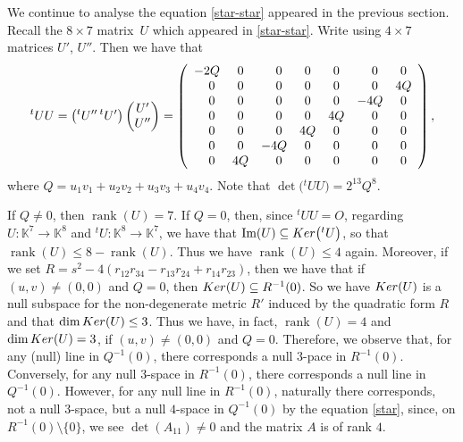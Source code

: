 \documentclass[11pt]{article}
\numberwithin{equation}{section}
\numberwithin{equation}{section}
\theoremstyle{definition}
\newcommand{\KK}{\mathbb{K}}
\newcommand{\0}{\boldsymbol{0}}
\newcommand{\rank}{\operatorname{rank}}
\begin{document}
We continue to analyse the equation \eqref{star-star} appeared in the previous section.
Recall the $8\times7$ matrix~$U$ which appeared in \eqref{star-star}.
Write  using $4\times 7$ matrices $U'$, $U''$.
Then we have that
\[
{}^tU U = \bigl({}^tU'' \, {}^t U'\bigr)\begin{pmatrix}U' \\ U''\end{pmatrix}
=
\left(
\begin{array}{ccccccc}
-2Q & 0 & \hphantom{-}0 & 0 & 0 & \hphantom{-}0 & 0
\\
\hphantom{-}0 & 0 & \hphantom{-}0 & 0 & 0 & \hphantom{-}0 & 4Q
\\
\hphantom{-}0 & 0 & \hphantom{-}0 & 0 & 0 & -4Q & 0
\\
\hphantom{-}0 & 0 & \hphantom{-}0 & 0 & 4Q & \hphantom{-}0 & 0
\\
\hphantom{-}0 & 0 & \hphantom{-}0 & 4Q & 0 & \hphantom{-}0 & 0
\\
\hphantom{-}0 & 0 & -4Q & 0 & 0 & \hphantom{-}0 & 0
\\
\hphantom{-}0 & 4Q & \hphantom{-}0 & 0 & 0 & \hphantom{-}0 & 0
\end{array}
\right),
\]
where $Q = u_1v_1 + u_2v_2 + u_3v_3 + u_4v_4$. Note that $\det\bigl({}^tU U\bigr) = 2^{13} Q^8$.

If $Q \not= 0$, then $\rank(U) = 7$. If $Q = 0$, then, since
${}^tU U = O$, regarding $U \colon \KK^7 \to \KK^8$ and
${}^tU \colon \KK^8 \to \KK^7$,
we have that ${\mbox{\rm Im}}(U) \subseteq {\rm Ker}\bigl({}^tU\bigr)$,
so that $\rank(U) \leq 8 - \rank(U)$. Thus we have $\rank(U) \leq 4$ again.
Moreover, if we set
$R = s^2 - 4(r_{12}r_{34} - r_{13}r_{24} + r_{14}r_{23})$, then
we have that if $(u, v) \not= (0, 0)$ and $Q = 0$, then ${\rm Ker}(U) \subseteq R^{-1}(0)$.
So we have ${\rm Ker}(U)$ is a null subspace for the non-degenerate
metric $R'$ induced by the quadratic form $R$ and that
$\dim{\rm Ker}(U) \leq 3$. Thus we have, in fact, $\rank(U) = 4$ and $\dim{\rm Ker}(U) = 3$, if $(u, v) \not= (0, 0)$ and $Q = 0$.
Therefore, we observe that, for any (null) line in $Q^{-1}(0)$, there corresponds a null $3$-pace in $R^{-1}(0)$.
Conversely, for any null $3$-space in $R^{-1}(0)$, there corresponds a null line in $Q^{-1}(0)$.
However, for any null line in $R^{-1}(0)$, naturally there corresponds,
not a null $3$-space, but a null $4$-space in $Q^{-1}(0)$
by the equation \eqref{star}, since, on $R^{-1}(0) \setminus \{ 0\}$, we see $\det(A_{11}) \not= 0$ and the matrix
$A$ is of rank $4$.
\end{document}

